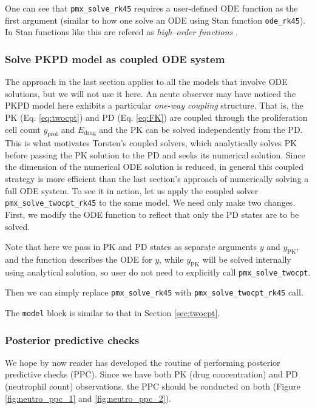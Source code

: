 One can see that \texttt{pmx\_solve\_rk45}
requires a user-defined ODE function as the first argument (similar to
how one solve an ODE using Stan function
\texttt{ode\_rk45}). In Stan functions like this are refered as
\emph{high--order functions} \cite[Chapter 9]{Stan:2021}.

\subsubsection{Solve PKPD model as coupled ODE system}
The approach in the last section applies to all the models that involve
ODE solutions, but we will not use it here. An acute
observer may have noticed the PKPD model here exhibits a particular
\emph{one-way coupling} structure.
That is, the PK (Eq. \eqref{eq:twocpt})
and PD (Eq. \eqref{eq:FK}) are
coupled through the proliferation cell count
$y_{\text{prol}}$ and $E_{\text{drug}}$ and the PK 
can be solved independently from the PD. This is what motivates Torsten's coupled solvers,
which analytically solves PK before
passing the PK solution to the PD and seeks its numerical
solution. Since the dimension of the numerical ODE solution is reduced, in general this coupled strategy is more efficient than
the last section's approach of numerically solving a full ODE system.
To see it in action, let us apply the
coupled solver \texttt{pmx\_solve\_twocpt\_rk45} \cite[Section 3.5]{Torsten:2021} to the same model. We need only make two changes. First, we
modify the ODE function to reflect that only the PD states are to be solved.


Note that here we pass in PK and PD states as separate arguments $y$
and $y_{\text{PK}}$, and the function describes the ODE for $y$, while
$y_{\text{PK}}$ will be solved internally using analytical solution,
so user do not need to explicitly call \texttt{pmx\_solve\_twocpt}.

Then we can simply replace \texttt{pmx\_solve\_rk45} with
\texttt{pmx\_solve\_twocpt\_rk45} call.


The \texttt{model} block is similar to that in Section \ref{sec:twocpt}.


\subsubsection{Posterior predictive checks}
We hope by now reader has developed the routine of performing
posterior predictive checks (PPC). Since we have both PK (drug
concentration) and PD (neutrophil count) observations, the PPC should
be conducted on both (Figure \ref{fig:neutro_ppc_1} and \ref{fig:neutro_ppc_2}).


